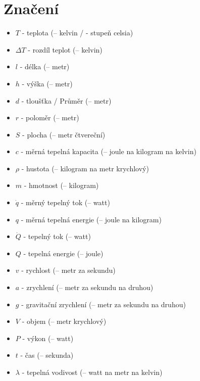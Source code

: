 \documentclass{article}
\begin{document}
\maketitle
\tableofcontents
\newpage



\section{Značení}

\begin{itemize}
    \item $T$ - teplota (\ueqK \fs -- kelvin / \ueqCELS \fs - stupeň celsia)
    \item $\Delta T$ - rozdíl teplot (\ueqK \fs -- kelvin)
    \item $l$ - délka (\ueqM \fs -- metr)
    \item $h$ - výška (\ueqM \fs -- metr)
    \item $d$ - tloušťka / Průměr (\ueqM \fs -- metr)
    \item $r$ - poloměr (\ueqM \fs -- metr)
    \item $S$ - plocha (\ueqMsq \fs -- metr čtvereční)
    \item $c$ - měrná tepelná kapacita (\ueqJandKGinvKinv \fs -- joule na kilogram na kelvin)
    \item $\rho$ - hustota (\ueqKGandMinvcu \fs -- kilogram na metr krychlový)
    \item $m$ - hmotnost (\ueqKG \fs -- kilogram)
    \item $\dot{q}$ - měrný tepelný tok (\ueqWandMinvsq \fs -- watt)
    \item $q$ - měrná tepelná energie (\ueqJandMinvsq \fs -- joule na kilogram)
    \item $\dot{Q}$ - tepelný tok (\ueqW \fs -- watt)
    \item $Q$ - tepelná energie (\ueqJ \fs -- joule)
    \item $v$ - rychlost (\ueqMandSinv \fs -- metr za sekundu)
    \item $a$ - zrychlení (\ueqMandSinvsq \fs -- metr za sekundu na druhou)
    \item $g$ - gravitační zrychlení (\ueqMandSinvsq \fs -- metr za sekundu na druhou)
    \item $V$ - objem (\ueqMcu \fs -- metr krychlový)
    \item $P$ - výkon (\ueqW \fs -- watt)
    \item $t$ - čas (\ueqS \fs -- sekunda)
    \item $\lambda$ - tepelná vodivost (\ueqWandMinvKinv \fs -- watt na metr na kelvin)

\end{itemize}
\end{document}
